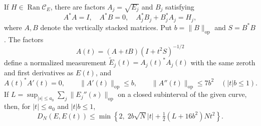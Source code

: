 \begin{lemma}
\label{lem:horizontalcurve85}
If $H\in\operatorname{Ran}\mathcal C_E$, there are factors
$A_j=\sqrt{E_j}$ and $B_j$ satisfying
\[
 A^*A=I,\quad A^*B=0,\quad
 A_j^*B_j+B_j^*A_j=H_j,
\]
where $A,B$ denote the vertically stacked matrices.  Put
$b=\|B\|_{\mathrm{op}}$ and $S=B^*B$.  The factors
\begin{equation}\label{eq:horizontalcurve85}
 A(t)=(A+tB)(I+t^2S)^{-1/2}
\end{equation}
define a normalized measurement $\widetilde E_j(t)=A_j(t)^*A_j(t)$
with the same zeroth and first derivatives as $E(t)$, and
\[
 A(t)^*A'(t)=0,\qquad
 \|A'(t)\|_{\mathrm{op}}\le b,\qquad
 \|A''(t)\|_{\mathrm{op}}\le7b^2\quad(|t|b\le1).
\]
If $L=\sup_{|s|\le a_0}\sum_j\|E_j''(s)\|_{\mathrm{op}}$ on a
closed subinterval of the given curve, then, for $|t|\le a_0$ and
$|t|b\le1$,
\begin{equation}\label{eq:curvesqlupper85}
 D_N(E,E(t))\le
 \min\left\{2,\;2b\sqrt N|t|+
             \tfrac12(L+16b^2)Nt^2\right\}.
\end{equation}
\end{lemma}
